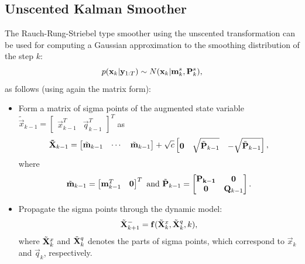 %
\subsection{Unscented Kalman Smoother}
%

The Rauch-Rung-Striebel type smoother using the unscented
transformation \citep{Sarkka:2008} can be used for computing a Gaussian
approximation to the smoothing distribution of the step $k$:
%
\begin{equation}
%
p(\vec{x}_k|\vec{y}_{1:T}) \sim N(\vec{x}_k|\vec{m}_k^s,\mat{P}_k^s),
%
\end{equation}
% 
as follows (using again the matrix form):
%
\begin{itemize}
%
\item Form a matrix of sigma points of the augmented state variable
$\tilde{\vec{x}}_{k-1} =
\begin{bmatrix} \vec{x}_{k-1}^T & \vec{q}_{k-1}^T \end{bmatrix}^T$ as
%
\begin{equation}
%
\mat{\tilde{X}}_{k-1} =
   \begin{bmatrix} \tilde{\vec{m}}_{k-1} & \cdots &
\tilde{\vec{m}}_{k-1} \end{bmatrix} + \sqrt{c}
   \begin{bmatrix} \vec{0} & \sqrt{\tilde{\mat{P}}_{k-1}} &
-\sqrt{\tilde{\mat{P}}_{k-1}}
   \end{bmatrix},
%
\label{eq:urts1}
\end{equation}
%
where
%
\begin{equation}
%
\tilde{\vec{m}}_{k-1} = \begin{bmatrix} \vec{m}_{k-1}^T & \vec{0}
\end{bmatrix}^T
%
\text{ and }
%
\tilde{\mat{P}}_{k-1} =
\begin{bmatrix} \mat{P_{k-1}} & \mat{0} \\ \mat{0} & \mat{Q}_{k-1} \\
\end{bmatrix}.
\label{eq:urts2}
\end{equation}
%
\item Propagate the sigma points through the dynamic model:
%
\begin{equation}
%
\tilde{\mat{X}}_{k+1}^- =
\vec{f}(\tilde{\mat{X}}^x_{k},\tilde{\mat{X}}^q_{k},k),
%
\label{eq:urts3}
\end{equation}
% 
where $\tilde{\mathbf{X}}^x_{k}$ and $\tilde{\mathbf{X}}^q_{k}$ denotes the
parts of sigma points, which correspond to $\vec{x}_k$ and
$\vec{q}_k$, respectively.


\end{itemize}
